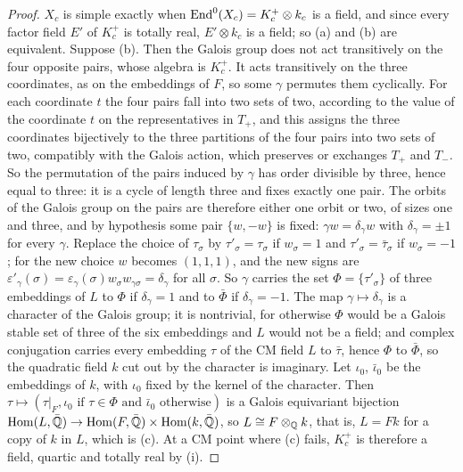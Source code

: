 \begin{proof}
$X_{c}$ is simple exactly when $\operatorname{End}^{0}(X_{c})=K_{c}^{+}\otimes k_{c}$ is a
field, and since every factor field $E'$ of $K_{c}^{+}$ is totally real,
$E'\otimes k_{c}$ is a field; so (a) and (b) are equivalent. Suppose (b).
Then the Galois group does not act transitively on the four opposite pairs,
whose algebra is $K_{c}^{+}$. It acts transitively on the three
coordinates, as on the embeddings of $F$, so some $\gamma$ permutes them
cyclically. For each coordinate $t$ the four pairs fall into two sets of
two, according to the value of the coordinate $t$ on the representatives in
$T_{+}$, and this assigns the three coordinates bijectively to the three
partitions of the four pairs into two sets of two, compatibly with the
Galois action, which preserves or exchanges $T_{+}$ and $T_{-}$. So the
permutation of the pairs induced by $\gamma$ has order divisible by three,
hence equal to three: it is a cycle of length three and fixes exactly one
pair. The orbits of the Galois group on the pairs are therefore either one
orbit or two, of sizes one and three, and by hypothesis some pair
$\{w,-w\}$ is fixed: $\gamma w=\delta_{\gamma}w$ with
$\delta_{\gamma}=\pm1$ for every $\gamma$. Replace the choice of
$\tau_{\sigma}$ by $\tau'_{\sigma}=\tau_{\sigma}$ if $w_{\sigma}=1$ and
$\tau'_{\sigma}=\bar{\tau}_{\sigma}$ if $w_{\sigma}=-1$; for the new choice
$w$ becomes $(1,1,1)$, and the new signs are
$\varepsilon'_{\gamma}(\sigma)=\varepsilon_{\gamma}(\sigma)w_{\sigma}
w_{\gamma\sigma}=\delta_{\gamma}$ for all $\sigma$. So $\gamma$ carries the
set $\Phi=\{\tau'_{\sigma}\}$ of three embeddings of $L$ to $\Phi$ if
$\delta_{\gamma}=1$ and to $\bar{\Phi}$ if $\delta_{\gamma}=-1$. The map
$\gamma\mapsto\delta_{\gamma}$ is a character of the Galois group; it is
nontrivial, for otherwise $\Phi$ would be a Galois stable set of three of the
six embeddings and $L$ would not be a field; and complex conjugation carries
every embedding $\tau$ of the CM field $L$ to $\bar{\tau}$, hence $\Phi$ to
$\bar{\Phi}$, so the quadratic field $k$ cut out by the character is
imaginary. Let $\iota_{0}$, $\bar{\iota}_{0}$ be the embeddings of $k$, with
$\iota_{0}$ fixed by the kernel of the character. Then $\tau\mapsto(\tau|_{F},
\iota_{0}\text{ if }\tau\in\Phi\text{ and }\bar{\iota}_{0}\text{ otherwise})$
is a Galois equivariant bijection $\operatorname{Hom}(L,\bar{\mathbb{Q}})\to
\operatorname{Hom}(F,\bar{\mathbb{Q}})\times\operatorname{Hom}(k,\bar{\mathbb{Q}})$, so
$L\cong F\otimes_{\mathbb{Q}}k$, that is, $L=Fk$ for a copy of $k$ in $L$, which is
(c). At a CM point where (c) fails, $K_{c}^{+}$ is therefore a field, quartic
and totally real by (i).


\end{proof}
